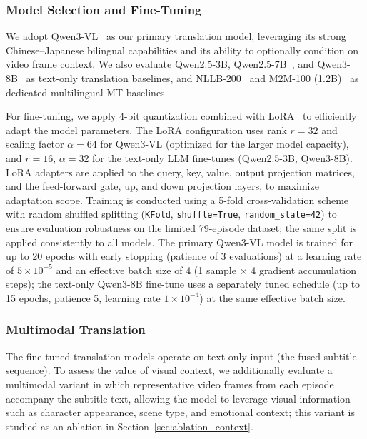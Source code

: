 \documentclass[journal]{IEEEtran}
\begin{document}
\subsubsection{Model Selection and Fine-Tuning}
We adopt Qwen3-VL~\cite{qwen3vl2025} as our primary translation model, leveraging its strong Chinese--Japanese bilingual capabilities and its ability to optionally condition on video frame context.
We also evaluate Qwen2.5-3B, Qwen2.5-7B~\cite{yang2024qwen2}, and Qwen3-8B~\cite{qwen3_2025} as text-only translation baselines, and NLLB-200~\cite{nllb2022} and M2M-100 (1.2B)~\cite{fan2021beyond} as dedicated multilingual MT baselines.

For fine-tuning, we apply 4-bit quantization combined with LoRA~\cite{hu2022lora} to efficiently adapt the model parameters.
The LoRA configuration uses rank $r = 32$ and scaling factor $\alpha = 64$ for Qwen3-VL (optimized for the larger model capacity), and $r = 16$, $\alpha = 32$ for the text-only LLM fine-tunes (Qwen2.5-3B, Qwen3-8B).
LoRA adapters are applied to the query, key, value, output projection matrices, and the feed-forward gate, up, and down projection layers, to maximize adaptation scope.
Training is conducted using a 5-fold cross-validation scheme with random shuffled splitting (\texttt{KFold}, \texttt{shuffle=True}, \texttt{random\_state=42}) to ensure evaluation robustness on the limited 79-episode dataset; the same split is applied consistently to all models.
The primary Qwen3-VL model is trained for up to 20 epochs with early stopping (patience of 3 evaluations) at a learning rate of $5 \times 10^{-5}$ and an effective batch size of 4 (1 sample $\times$ 4 gradient accumulation steps); the text-only Qwen3-8B fine-tune uses a separately tuned schedule (up to 15 epochs, patience 5, learning rate $1 \times 10^{-4}$) at the same effective batch size.

\subsubsection{Multimodal Translation}
The fine-tuned translation models operate on text-only input (the fused subtitle sequence).
To assess the value of visual context, we additionally evaluate a multimodal variant in which representative video frames from each episode accompany the subtitle text, allowing the model to leverage visual information such as character appearance, scene type, and emotional context; this variant is studied as an ablation in Section~\ref{sec:ablation_context}.
\end{document}

